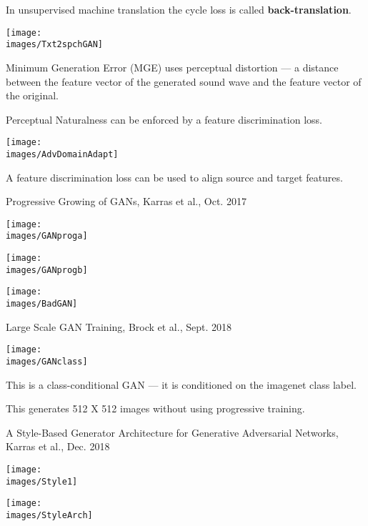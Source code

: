 {In unsupervised machine translation the cycle loss is called {\bf back-translation}.


\centerline{\texttt{[image: \\images/Txt2spchGAN]}}

\vfill
Minimum Generation Error (MGE) uses {\color{red} perceptual distortion} ---
a distance between the feature vector of the generated sound wave and the
feature vector of the original.

\vfill
{\color{red}Perceptual Naturalness} can be enforced by a feature discrimination loss.


\centerline{\texttt{[image: \\images/AdvDomainAdapt]}}

A feature discrimination loss can be used to align source and target features.


\centerline{Progressive Growing of GANs, Karras et al., Oct. 2017}

\centerline{\texttt{[image: \\images/GANproga]}}


\centerline{\texttt{[image: \\images/GANprogb]}}


\centerline{\texttt{[image: \\images/BadGAN]}}

\centerline{Large Scale GAN Training, Brock et al., Sept. 2018}
\centerline{\texttt{[image: \\images/GANclass]}}

\vfill
This is a class-conditional GAN --- it is conditioned on the imagenet class label.

\vfill
This generates 512 X 512 images without using progressive training.

{\Large A Style-Based Generator Architecture for Generative Adversarial Networks, Karras et al., Dec. 2018}

\centerline{\texttt{[image: \\images/Style1]}}


\centerline{\texttt{[image: \\images/StyleArch]}}


}
